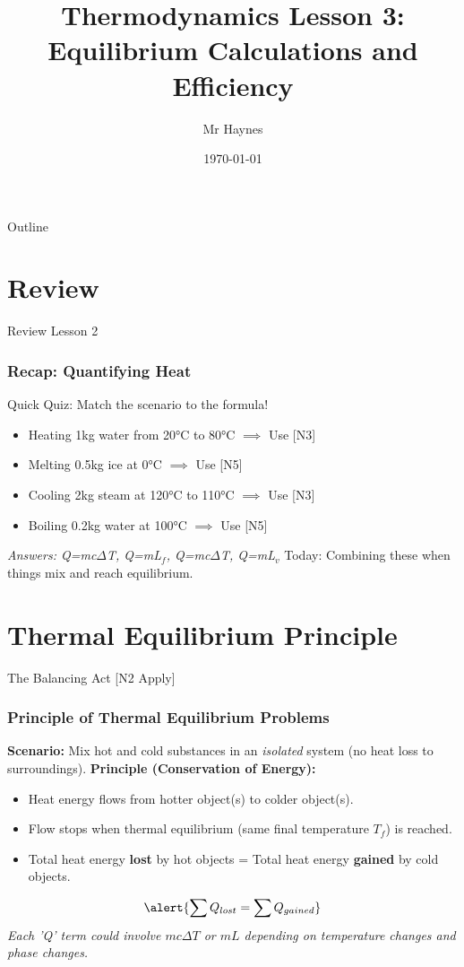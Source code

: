 \documentclass[xcolor=svgnames]{beamer}
\title[Thermo: Equilibrium]{Thermodynamics Lesson 3: Equilibrium Calculations and Efficiency}
\author[P. Haynes]{Mr Haynes}
\institute[GHS]{Gosford High School}
\date{\today}
\begin{document}
\begin{frame}
    \titlepage
\end{frame}

\begin{frame}{Outline}
    \tableofcontents
\end{frame}

\section{Review}
\begin{frame}{Review Lesson 2}
    \frametitle{Recap: Quantifying Heat}
    Quick Quiz: Match the scenario to the formula!
    \begin{itemize}
        \item Heating 1kg water from 20°C to 80°C $\implies$ Use \underline{\hspace{2cm}} [N3]
        \item Melting 0.5kg ice at 0°C $\implies$ Use \underline{\hspace{2cm}} [N5]
        \item Cooling 2kg steam at 120°C to 110°C $\implies$ Use \underline{\hspace{2cm}} [N3]
        \item Boiling 0.2kg water at 100°C $\implies$ Use \underline{\hspace{2cm}} [N5]
    \end{itemize}
    \pause
    \textit{Answers: Q=mc$\Delta$T, Q=mL$_f$, Q=mc$\Delta$T, Q=mL$_v$}
    \vspace{1em}
    Today: Combining these when things mix and reach equilibrium.
\end{frame}

\section{Thermal Equilibrium Principle}
\begin{frame}{The Balancing Act [N2 Apply]}
    \frametitle{Principle of Thermal Equilibrium Problems}
    \textbf{Scenario:} Mix hot and cold substances in an \textit{isolated} system (no heat loss to surroundings).
    \vspace{1em}
    \textbf{Principle (Conservation of Energy):}
    \begin{itemize}
        \item Heat energy flows from hotter object(s) to colder object(s).
        \item Flow stops when thermal equilibrium (same final temperature $T_f$) is reached.
        \item Total heat energy \textbf{lost} by hot objects = Total heat energy \textbf{gained} by cold objects.
    \end{itemize}
    \vspace{1em}
    \begin{equation*}
    \alert{\sum Q_{lost} = \sum Q_{gained}}
    \end{equation*}
    \textit{Each 'Q' term could involve $mc\Delta T$ or $mL$ depending on temperature changes and phase changes.}
\end{frame}
\end{document}
